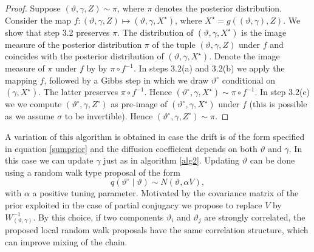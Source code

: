 \documentclass[preprint]{imsart}
\newcommand{\si}{\sigma}
\newcommand{\ga}{\gamma}
\theoremstyle{definition}
\begin{document}
\begin{proof}
Suppose $(\vartheta, \gamma, Z) \sim \pi $, where $\pi$ denotes  the posterior distribution. Consider the map $f\colon (\vartheta, \gamma, Z) \mapsto (\vartheta, \gamma,  X^\star)$, where $X^\star=g((\vartheta, \gamma), Z)$. 
We show that step 3.2 preserves $\pi$. The distribution of $(\vartheta, \gamma, X^\star)$ is the image measure of the posterior distribution $\pi$ of the tuple $(\vartheta, \gamma, Z)$ under $f$ and coincides with the posterior distribution of $(\vartheta, \gamma, X^\star)$. Denote the image measure of $\pi$ under $f$ by  by $\pi \circ f^{-1}$.   In steps 3.2(a) and 3.2(b) we apply the mapping $f$, followed by a Gibbs step  in which we draw $\vartheta^\circ$ conditional on $(\gamma, X^\star)$. The latter preserves $\pi \circ f^{-1}$. Hence $(\vartheta^\circ, \gamma, X^\star) \sim \pi \circ f^{-1}$. In step 3.2(c) we we compute $(\vartheta^\circ, \gamma, Z^\circ)$ as pre-image of $(\vartheta^\circ, \gamma, X^\star)$ under $f$ (this is possible as we assume $\si$ to be invertible). Hence $(\vartheta^\circ, \gamma, Z^\circ) \sim \pi$.
\end{proof}


A variation of this algorithm is obtained in case the drift is of the form specified in equation \eqref{sumprior} and the diffusion coefficient depends on both $\vartheta$ and $\ga$. In this case we can update $\gamma$ just as in algorithm \ref{alg2}. Updating $\vartheta$ can be done using a random walk type proposal of the form
\[ q(\vartheta^\circ \mid \vartheta) \sim N(\vartheta, \alpha V), \]
with $\alpha$ a positive tuning parameter. Motivated by the covariance matrix of the prior exploited in the case of partial conjugacy we propose to replace $V$ by $W^{-1}_{(\vartheta,\gamma)}$. 
By this choice, if two components $\vartheta_i$ and $\vartheta_j$ are  strongly correlated, the proposed local random walk proposals have the same correlation structure, which can improve mixing of the chain.
\end{document}
